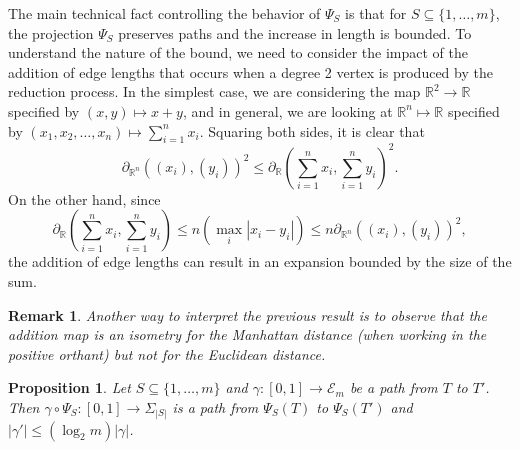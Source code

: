 \documentclass[a4paper,11pt]{article}
\newtheorem{proposition}[theorem]{Proposition}
\newtheorem{remark}[theorem]{Remark}
\newcommand{\aE}{\mathcal{E}}
\begin{document}
The main technical fact controlling the behavior of $\Psi_S$ is that for $S \subseteq \{1,\ldots,m\}$, the projection $\Psi_S$ preserves paths and the increase in length is bounded.
To understand the nature of the bound, we need to consider the impact of the addition of edge lengths that occurs when a degree 2 vertex is produced by the reduction process.
In the simplest case, we are considering the map $\mathbb{R}^2 \to \mathbb{R}$ specified by $(x,y) \mapsto x+y$, and in general, we are looking at $\mathbb{R}^n \mapsto \mathbb{R}$ specified by $(x_1, x_2, \ldots, x_n) \mapsto \sum_{i=1}^n x_i$.
Squaring both sides, it is clear that
\[
\partial_{\mathbb{R}^n}((x_i), (y_i))^2 \leq \partial_{\mathbb{R}}(\sum_{i=1}^n x_i, \sum_{i=1}^n y_i)^2.
\]
On the other hand, since 
\[
\partial_{\mathbb{R}}(\sum_{i=1}^n x_i, \sum_{i=1}^n y_i) \leq n(\max_i |x_i - y_i|) \leq n \partial_{\mathbb{R}^n}((x_i), (y_i))^2,
\]
the addition of edge lengths can result in an expansion bounded by the
size of the sum.

\begin{remark}
Another way to interpret the previous result is to observe that the addition map is an isometry for the Manhattan distance (when working in the positive orthant) but not for the Euclidean distance.
\end{remark}

\begin{proposition}\label{prop:projcont}
Let $S \subseteq \{1,\ldots,m\}$ and $\gamma \colon [0,1] \to \aE_m$ be a path from $T$ to $T'$.
Then $\gamma \circ \Psi_S \colon [0,1] \to \Sigma_{|S|}$ is a path from $\Psi_S(T)$ to $\Psi_S(T')$ and $|\gamma'| \leq (\log_2 m) |\gamma|$.
\end{proposition}
\end{document}
